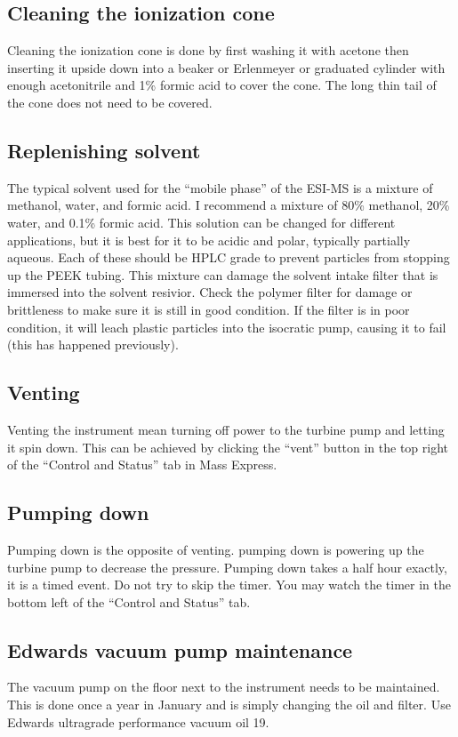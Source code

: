 \documentclass[12pt, letterpaper]{article}
\begin{document}
\subsection{Cleaning the ionization cone}
Cleaning the ionization cone is done by first washing it with acetone then inserting it upside down into a beaker or Erlenmeyer or graduated cylinder with enough acetonitrile and  1\% formic acid to cover the cone. 
The long thin tail of the cone does not need to be covered.

\subsection{Replenishing solvent}
The typical solvent used for the ``mobile phase'' of the ESI-MS is a mixture of methanol, water, and formic acid. 
I recommend a mixture of 80\% methanol, 20\% water, and 0.1\% formic acid.
This solution can be changed for different applications, but it is best for it to be acidic and polar, typically partially aqueous.
Each of these should be HPLC grade to prevent particles from stopping up the PEEK tubing. 
This mixture can damage the solvent intake filter that is immersed into the solvent resivior.
Check the polymer filter for damage or brittleness to make sure it is still in good condition.
If the filter is in poor condition, it will leach plastic particles into the isocratic pump, causing it to fail (this has happened previously).


\subsection{Venting}
Venting the instrument mean turning off power to the turbine pump and letting it spin down.
This can be achieved by clicking the ``vent'' button in the top right of the ``Control and Status'' tab in Mass Express.

\subsection{Pumping down}
Pumping down is the opposite of venting. pumping down is powering up the turbine pump to decrease the pressure.
Pumping down takes a  half hour exactly, it is a timed event.
Do not try to skip the timer.
You may watch the timer in the bottom left of the ``Control and Status'' tab.

\subsection{Edwards vacuum pump maintenance}
The vacuum pump on the floor next to the instrument needs to be maintained.
This is done once a year in January and is simply changing the oil and filter.
Use Edwards ultragrade performance vacuum oil 19.
\end{document}
